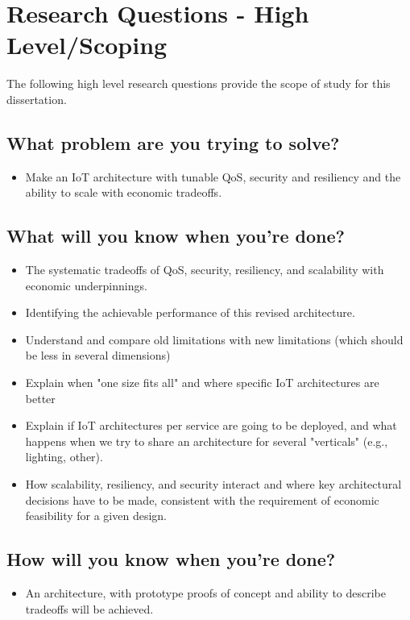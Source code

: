 \documentclass[../main.tex]{subfiles}
\begin{document}
\chapter{Research Questions - High Level/Scoping}

The following high level research questions provide the scope of study for this dissertation.

\section{What problem are you trying to solve?}
\begin{itemize}
    \item Make an IoT architecture with tunable QoS, security and resiliency and the ability to scale with economic tradeoffs.
\end{itemize}

\section{What will you know when you're done?}

\begin{itemize}
    \item The systematic tradeoffs of QoS, security, resiliency, and scalability with economic underpinnings.
    \item Identifying the achievable performance of this revised architecture.
    \item Understand and compare old limitations with new limitations (which should be less in several dimensions)
    \item Explain when "one size fits all" and where specific IoT architectures are better
    \item Explain if IoT architectures per service are going to be deployed, and what happens when we try to share an architecture for several "verticals" (e.g., lighting, other).
    \item How scalability, resiliency, and security interact and where key architectural decisions have to be made, consistent with the requirement of economic feasibility for a given design.
\end{itemize}


\section{How will you know when you're done?}

\begin{itemize}
    \item An architecture, with prototype proofs of concept and ability to describe tradeoffs will be achieved.
\end{itemize}
\end{document}
